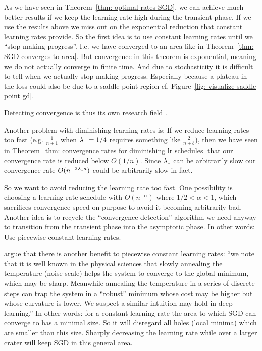 As we have seen in Theorem~\ref{thm: optimal rates SGD}, we can achieve
much better results if we keep the learning rate high during the transient
phase. If we use the results above we miss out on the exponential reduction that
constant learning rates provide. So the first idea is to use constant learning
rates until we ``stop making progress''. I.e. we have converged to an area like
in Theorem~\ref{thm: SGD converges to area}. But convergence in this theorem is
exponential, meaning we do not actually converge in finite time. And due to
stochasticity it is difficult to tell when we actually stop making progress.
Especially because a plateau in the loss could also be due to a saddle point
region cf. Figure~\ref{fig: visualize saddle point gd}.

Detecting convergence is thus its own research field \parencite[for a recent
approach including an overview of previous work see
e.g.][]{pesmeConvergenceDiagnosticBasedStep2020}.

Another problem with diminishing learning rates is: If we reduce learning rates
too fast (e.g. \(\tfrac{1}{n+1}\) when \(\lambda_1=1/4\) requires something
like \(\tfrac{2}{n+b}\)), then we have seen in Theorem~\ref{thm: convergence
rates for diminishing lr schedules} that our convergence rate is reduced below
\(O(1/n)\). Since \(\lambda_1\) can be arbitrarily slow our convergence rate
\(O(n^{-2\lambda_1 a})\) could be arbitrarily slow in fact.

So we want to avoid reducing the learning rate too fast. One possibility is
choosing a learning rate schedule with \(O(n^{-\alpha})\) where \(1/2<\alpha<1\),
which sacrifices convergence speed on purpose to avoid it becoming arbitrarily
bad. Another idea is to recycle the ``convergence detection'' algorithm we
need anyway to transition from the transient phase into the asymptotic phase.
In other words: Use piecewise constant learning rates.

\textcite{smithDonDecayLearning2018} argue that there is another benefit to
piecewise constant learning rates: ``we note that it is well known in the
physical sciences that slowly annealing the temperature (noise scale) helps the
system to converge to the global minimum, which may be sharp. Meanwhile
annealing the temperature in a series of discrete steps can trap the system in a
“robust” minimum whose cost may be higher but whose curvature is lower. We
suspect a similar intuition may hold in deep learning.''
In other words: for a constant learning rate the area to which SGD can converge
to has a minimal size. So it will disregard all holes (local minima) which are
smaller than this size. Sharply decreasing the learning rate while over a larger
crater will keep SGD in this general area.

